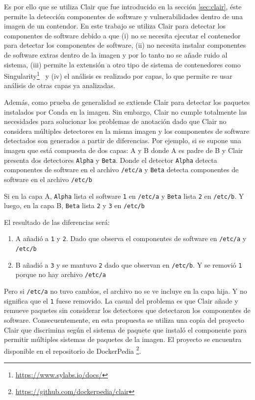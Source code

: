 Es por ello que se utiliza Clair que fue introducido en la sección  \ref{sec:clair}, éste permite la detección componentes de software y vulnerabilidades dentro de una imagen de un contendor.
En este trabajo se utiliza Clair para detectar los componentes de software debido a que (i) no se necesita ejecutar el contenedor para detectar los componentes de software, (ii) no necesita instalar componentes de software extras dentro de la imagen y por lo tanto no se añade ruido al sistema, (iii) permite la extensión a otro tipo de sistema de contenedores como Singularity\footnote{\url{https://www.sylabs.io/docs/}}~\cite{kurtzer2017singularity} y (iv) el análisis es realizado por capas, lo que permite re usar análisis de otras capas ya analizadas.

Además, como prueba de generalidad se extiende Clair para detectar los paquetes instalados por Conda en la imagen.  
Sin embargo, Clair no cumple totalmente las necesidades para solucionar los problemas de anotación dado que Clair no considera múltiples detectores en la misma imagen y los componentes de software detectados son generados a partir de diferencias.
Por ejemplo, si se supone una imagen que está compuesta de dos capas: A y B donde A es padre de B y Clair presenta dos detectores \texttt{Alpha} y \texttt{Beta}. 
Donde el detector \texttt{Alpha} detecta componentes de software en el archivo \verb|/etc/a| y  \texttt{Beta} detecta componentes de software en el archivo \verb|/etc/b|

Si en la capa A, \texttt{Alpha} lista el software \verb|1| en \verb|/etc/a| y \texttt{Beta} lista \verb|2| en  \verb|/etc/b|. Y luego, en la capa B, \texttt{Beta}  lista \verb|2| y \verb|3| en  \verb|/etc/b|

El resultado de las diferencias será: 

\begin{enumerate}
	\item A añadió a \verb|1| y \verb|2|. Dado que observa el componentes de software en \verb|/etc/a| y \verb|/etc/b|
	\item  B añadió a \verb|3| y se mantuvo \verb|2| dado que observan en \verb|/etc/b|. Y se removió \verb|1| porque no hay archivo \verb|/etc/a|
\end{enumerate}

Pero si \verb|/etc/a| no tuvo cambios, el archivo no se ve incluye en la capa hija. Y no significa que el \verb|1| fuese removido. 
La casual del problema es que Clair añade y remueve paquetes sin considerar los detectores que detectaron los componentes de software. 
Consecuentemente, en esta propuesta se utiliza una copia del proyecto Clair que discrimina según el sistema de paquete que instaló el componente para permitir múltiples sistemas de paquetes de la imagen. El proyecto se encuentra disponible en el repositorio de DockerPedia \footnote{\url{https://github.com/dockerpedia/clair}}.

